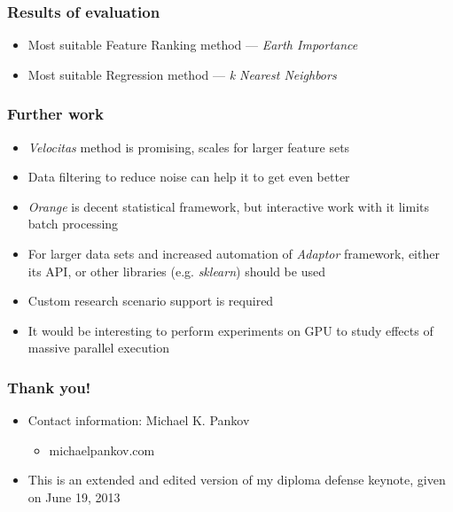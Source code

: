 \documentclass{beamer}
\begin{document}
\begin{frame}
\frametitle{Results of evaluation}
	\begin{itemize}
		\item Most suitable Feature Ranking method --- \textit{Earth Importance}
		\item Most suitable Regression method --- \textit{k Nearest Neighbors}
	\end{itemize}
\end{frame}

\begin{frame}
\frametitle{Further work}

	\begin{itemize}
		\item \textit{Velocitas} method is promising, scales for larger feature sets
		\item Data filtering to reduce noise can help it to get even better
		\item \textit{Orange} is decent statistical framework, but interactive work with it limits batch processing
		\item For larger data sets and increased automation of \textit{Adaptor} framework, either its API, or other libraries (e.g. \textit{sklearn}) should be used
		\item Custom research scenario support is required
		\item It would be interesting to perform experiments on GPU to study effects of massive parallel execution
	\end{itemize}
\end{frame}

\begin{frame}
\frametitle{Thank you!}

	\begin{itemize}
		\item Contact information: Michael K. Pankov
		\begin{itemize}
			\item michaelpankov.com
		\end{itemize}
		\item This is an extended and edited version of my diploma defense keynote, given on June 19, 2013
	\end{itemize}
\end{frame}
\end{document}
